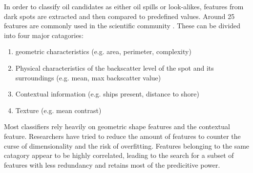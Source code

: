 In order to classify oil candidates as either oil spills or look-alikes, features from dark spots are extracted and then compared to predefined values. Around 25 features are commonly used in the scientific community \cite{Topouzelis200930}. These can be divided into four major catagories\cite{Brekke200595}:
\begin{enumerate}
\item geometric characteristics (e.g. area, perimeter, complexity)
\item Physical characteristics of the backscatter level of the spot and its surroundings (e.g. mean, max backscatter value)
\item Contextual information (e.g. ships present, distance to shore)
\item Texture (e.g. mean contrast)
\end{enumerate}
Most classifiers rely heavily on geometric shape features and the contextual feature.\cite{Xu201414} Researchers have tried to reduce the amount of features to counter the curse of dimensionality and the risk of overfitting. Features belonging to the same catagory appear to be highly correlated\cite{Xu201414}, leading to the search for a subset of features with less redundancy and retains most of the predicitive power\cite{Topouzelis200930}. 
